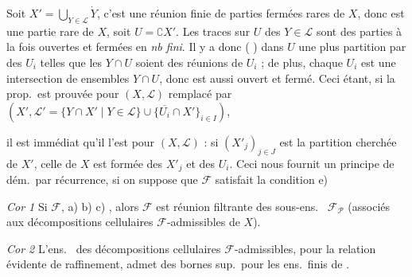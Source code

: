 \documentclass[11pt,a4paper]{article}
\begin{document}

\struck{\ill{}} Soit $X' = \bigcup_{Y \in \mathcal{L}} \dot{Y}$, c'est une
réunion finie de parties fermées rares de $X$, donc est une partie rare de
$X$, soit  $U = \complement X'$. Les traces
 sur $U$ des $Y \in \mathcal{L}$ sont des 
parties à la fois ouvertes et fermées \struck{\ill{}} en \emph{nb fini}. Il y
a donc ( ) dans $U$ une plus
 \struck{\ill{}} partition  par des $U_i$
\struck{\ill{}} telles que les $Y \cap U$ soient des réunions 
de $U_i$ ; de plus, chaque $U_i$ est une intersection 
de  ensembles $Y \cap U$, donc est aussi ouvert et fermé.
Ceci étant, si la prop.\ est prouvée pour \struck{\ill{}} $(X, \mathcal{L})$ remplacé par $(X', \mathcal{L}' = \lbrace Y
\cap X' \mid Y \in \mathcal{L} \rbrace \cup \lbrace \overline{U_i} \cap X'
\rbrace_{i \in I})$,


il est immédiat qu'il l'est pour $(X, \mathcal{L})$ : si $(X'_j)_{j \in J}$
est la partition cherchée de $X'$, celle de $X$ est formée des $X'_j$ et des
$U_i$. Ceci nous fournit un principe de dém.\ par récurrence, si on suppose
que $\mathcal{F}$ satisfait la condition e)

\emph{Cor 1} Si $\mathcal{F}$,   a) b) c)  ,
alors $\mathcal{F}$ est réunion filtrante des sous-ens.\ 
$\mathcal{F}_{\mathcal{P}}$ (associés aux décompositions cellulaires
\struck{\ill{}} $\mathcal{F}$-admissibles de $X$).

\emph{Cor 2} L'ens.\ \add{$\Sigma$} des décompositions cellulaires
$\mathcal{F}$-admissibles, pour la relation évidente de raffinement, admet des
bornes sup.\ pour les ens.\ finis de \add{$\Sigma$}
\struck{\ill{}}.
\end{document}
